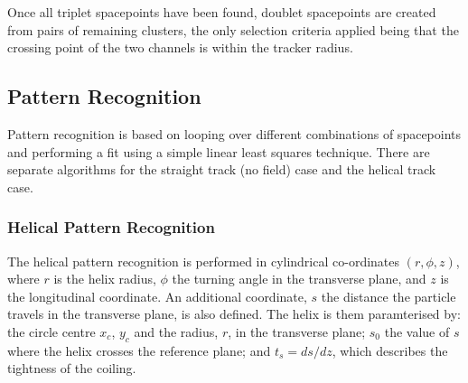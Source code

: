   Once all triplet spacepoints have been found, doublet spacepoints are created from pairs of remaining clusters, the only selection criteria applied being that the crossing point of the two channels is within the tracker radius. 


  \subsection{Pattern Recognition}
  \label{subsec:PatternRecognition}

  Pattern recognition is based on looping over different combinations of spacepoints and performing a fit using a simple linear least squares technique. There are separate algorithms for the straight track (no field) case and the helical track case.

   \subsubsection{Helical Pattern Recognition}
   \label{subsubsec:HelicalPatternRecognition}

   
   The helical pattern recognition is performed in cylindrical co-ordinates $(r, \phi, z)$, where $r$ is the helix radius, $\phi$ the turning angle in the transverse plane, and $z$ is the longitudinal coordinate. An additional coordinate, $s$ the distance the particle travels in the transverse plane, is also defined. The helix is them paramterised by: the circle centre $x_c$, $y_c$ and the radius, $r$, in the transverse plane; $s_0$ the value of $s$ where the helix crosses the reference plane; and $t_s = ds/dz$, which describes the tightness of the coiling. %

